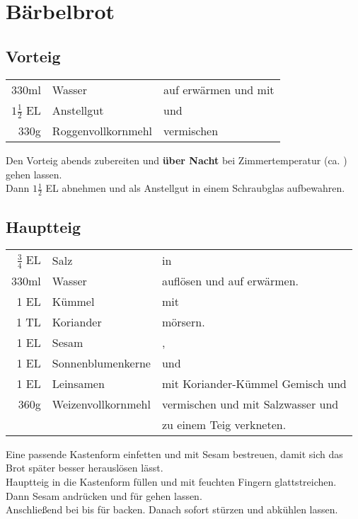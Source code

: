 \section{Bärbelbrot}
\subsection*{Vorteig}\label{vorteig}
\begin{longtable}{rlL{15.9cm}}
	330ml				&	Wasser				&	auf  erwärmen und mit	\\
	$1\frac{1}{2}$ EL	&	Anstellgut			&	und	\\
	330g				&	Roggenvollkornmehl	&	vermischen	\\
\end{longtable}

Den Vorteig abends zubereiten und \textbf{über Nacht} bei Zimmertemperatur (ca. ) gehen lassen.\\
Dann $1\frac{1}{2}$ EL abnehmen und als Anstellgut in einem Schraubglas aufbewahren.

\subsection*{Hauptteig}
\begin{longtable}{rlL{16cm}}
	$\frac{3}{4}$ EL	&	Salz				&	in	\\
	330ml				&	Wasser				&	auflösen und auf  erwärmen.	\\
	1 EL				&	Kümmel				&	mit	\\
	1 TL				&	Koriander			&	mörsern.	\\
	1 EL				&	Sesam				&	,	\\
	1 EL				&	Sonnenblumenkerne	&	und	\\
	1 EL				&	Leinsamen			&	mit Koriander-Kümmel Gemisch und	\\
	360g				&	Weizenvollkornmehl	&	vermischen und mit Salzwasser und	\\
						&		&	zu einem Teig verkneten.	\\
\end{longtable}

Eine passende Kastenform einfetten und mit Sesam bestreuen, damit sich das Brot später besser herauslösen lässt.\\
Hauptteig in die Kastenform füllen und mit feuchten Fingern glattstreichen.
Dann Sesam andrücken und für  gehen lassen.\\
Anschließend bei  bis  für  backen.
Danach sofort stürzen und abkühlen lassen.